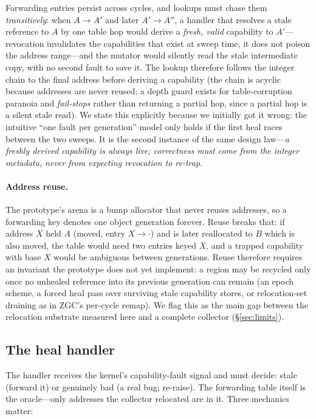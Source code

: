 \documentclass[acmsmall,nonacm,screen]{acmart}
\begin{document}
Forwarding entries persist across cycles, and lookups must chase them
\emph{transitively}: when $A\to A'$ and later $A'\to A''$, a handler
that resolves a stale reference to $A$ by one table hop would derive a
\emph{fresh, valid} capability to $A'$---revocation invalidates the
capabilities that exist at sweep time, it does not poison the address
range---and the mutator would silently read the stale intermediate
copy, with no second fault to save it. The lookup therefore follows the
integer chain to the final address before deriving a capability (the
chain is acyclic because addresses are never reused; a depth guard
exists for table-corruption paranoia and \emph{fail-stops} rather than
returning a partial hop, since a partial hop is a silent stale read). We
state this explicitly because we initially got it wrong: the intuitive
``one fault per generation'' model only holds if the first heal races
between the two sweeps. It is the second instance of the same design
law---\emph{a freshly derived capability is always live; correctness
must come from the integer metadata, never from expecting revocation to
re-trap}.

\paragraph{Address reuse.} The prototype's arena is a bump allocator
that never reuses addresses, so a forwarding key denotes one object
generation forever. Reuse breaks that: if address $X$ held $A$ (moved,
entry $X\to\cdot$) and is later reallocated to $B$ which is also
moved, the table would need two entries keyed $X$, and a trapped
capability with base $X$ would be ambiguous between generations. Reuse
therefore requires an invariant the prototype does not yet implement:
a region may be recycled only once no unhealed reference into its
previous generation can remain (an epoch scheme, a forced heal pass
over surviving stale capability stores, or relocation-set draining as
in ZGC's per-cycle remap). We flag this as the main gap between the
relocation substrate measured here and a complete collector
(\S\ref{sec:limits}).

\subsection{The heal handler}
\label{sec:design:heal}

The handler receives the kernel's capability-fault signal and must
decide: stale (forward it) or genuinely bad (a real bug; re-raise). The
forwarding table itself is the oracle---only addresses the collector
relocated are in it. Three mechanics matter:
\end{document}
